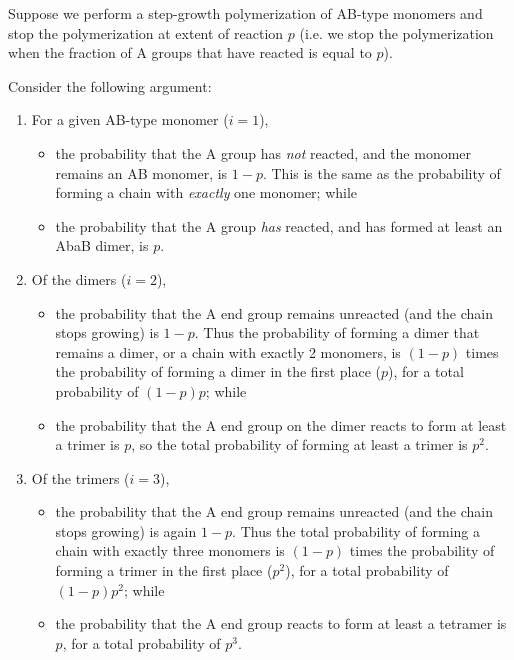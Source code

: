 \begin{activity}
\begin{instructornotes}
\end{instructornotes}


\begin{model}

Suppose we perform a step-growth polymerization of AB-type monomers and stop the polymerization at extent of reaction $p$ (i.e. we stop the polymerization when the fraction of A groups that have reacted is equal to $p$).

Consider the following argument:
\begin{enumerate}
\item For a given AB-type monomer ($i=1$), 
\begin{itemize}
	\item the probability that the A group has \textit{not} reacted, and the monomer remains an AB monomer, is $1-p$.  This is the same as the probability of forming a chain with \emph{exactly} one monomer; while

	\item the probability that the A group \textit{has} reacted, and has formed at least an AbaB dimer, is $p$.
\end{itemize}

\item Of the dimers ($i=2$),
\begin{itemize}
	\item the probability that the A end group remains unreacted (and the chain stops growing) is $1-p$. Thus the probability of forming a dimer that remains a dimer, or a chain with exactly 2 monomers, is $(1-p)$ times the probability of forming a dimer in the first place ($p$), for a total probability of $(1-p)p$; while

	\item the probability that the A end group on the dimer reacts to form at least a trimer is $p$, so the total probability of forming at least a trimer is $p^2$.
\end{itemize}

\item Of the trimers ($i=3$),
\begin{itemize}
	\item the probability that the A end group remains unreacted (and the chain stops growing) is again $1-p$.  Thus the total probability of forming a chain with exactly three monomers is $(1-p)$ times the probability of forming a trimer in the first place ($p^2$), for a total probability of $(1-p)p^2$; while
	\item the probability that the A end group reacts to form at least a tetramer is $p$, for a total probability of $p^3$.
\end{itemize}


\end{enumerate}
\end{model}
\end{activity}
